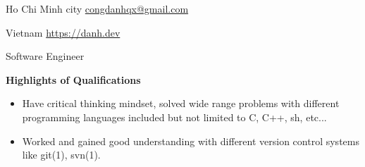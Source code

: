\documentclass[letterpaper,11pt]{article}
\newcommand{\resheading}[1]{
  {\large \colorbox{mygrey}
    {\begin{minipage}{\textwidth}
      {\textbf{#1 \vphantom{p\^{E}}}}
    \end{minipage}}}}
\newcommand{\email}[1]{\href{mailto:#1}{#1}}
\begin{document}
Ho Chi Minh city \hfill \email{congdanhqx@gmail.com}

Vietnam  \hfill \url{https://danh.dev}

\begin{center}
  \Large Software Engineer
\end{center}

\resheading{Highlights of Qualifications}
\begin{itemize}
  \item Have critical thinking mindset, solved wide range problems
    with different programming languages included but not limited to
    C, C++, sh, etc...
  \item Worked and gained good understanding with different version control
    systems like git(1), svn(1).
\end{itemize}
\end{document}

